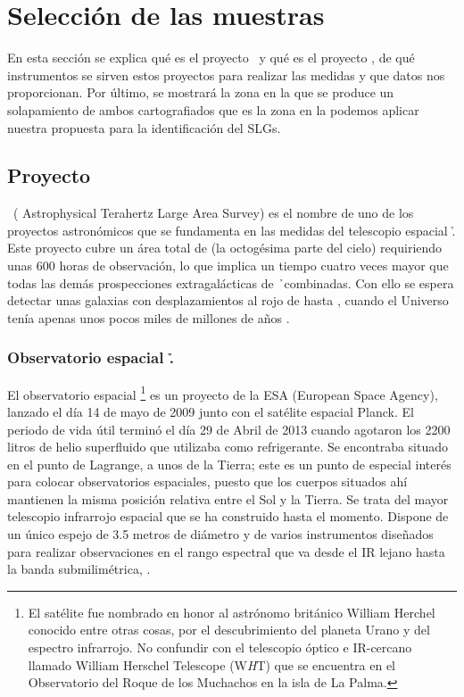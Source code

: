 \section{Selección de las muestras}\label{sec:2_muestras}

En esta sección se explica qué es el proyecto \hatlas\ y qué es el proyecto \gama, de qué instrumentos se sirven estos proyectos para realizar las medidas y que datos nos proporcionan. Por último, se mostrará la zona en la que se produce un solapamiento de ambos cartografiados que es la zona en la podemos aplicar nuestra propuesta para la identificación del SLGs.

\subsection{Proyecto \hatlas}

\hatlas\ ( Astrophysical Terahertz Large Area Survey) es el nombre de uno de los proyectos astronómicos que se fundamenta en las medidas del telescopio espacial \h. Este proyecto cubre un área total de  (la octogésima parte del cielo) requiriendo unas 600 horas de observación, lo que implica un tiempo cuatro veces mayor que todas las demás prospecciones extragalácticas de \h\ combinadas. 
Con ello se espera detectar unas  galaxias con desplazamientos al rojo de hasta , cuando el Universo tenía apenas unos pocos miles de millones de años \citep{website:hatlas}.

\subsubsection{Observatorio espacial \h.}

El observatorio espacial \h\footnote{El satélite fue nombrado en honor al astrónomo británico William Herchel conocido entre otras cosas, por el descubrimiento del planeta Urano y del espectro infrarrojo. No confundir con el telescopio óptico e IR-cercano llamado William Herschel Telescope (W\textit{H}T) que se encuentra en el Observatorio del Roque de los Muchachos en la isla de La Palma.} es un proyecto de la ESA (European Space Agency), lanzado el día 14 de mayo de 2009 junto con el satélite espacial Planck. El periodo de vida útil terminó el día 29 de Abril de 2013 cuando agotaron los 2200 litros de helio superfluido que utilizaba como refrigerante. Se encontraba situado en el punto  de Lagrange, a unos  de la Tierra; este es un punto de especial interés para colocar observatorios espaciales, puesto que los cuerpos situados ahí mantienen la misma posición relativa entre el Sol y la Tierra.
Se trata del mayor telescopio infrarrojo espacial que se ha construido hasta el momento. Dispone de un único espejo de 3.5 metros de diámetro y de varios instrumentos diseñados para realizar observaciones en el rango espectral que va desde el IR lejano hasta la banda submilimétrica, . 

